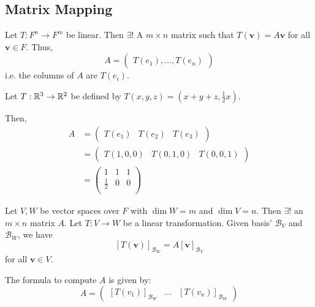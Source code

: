 \documentclass{article}
\begin{document}
\subsection{Matrix Mapping}
\begin{theorem}
  Let $T: F^n \to F^m$ be linear. Then $\exists!$ A $m \times n$ matrix such that $T(\textbf{v}) = A\textbf{v}$ for all $\textbf{v} \in F$. Thus,
  \[A =
    \begin{pmatrix}
      T(e_1), \ldots, T(e_n)
    \end{pmatrix}\] i.e. the columns of $A$ are $T(e_i)$.
\end{theorem}
\begin{example}
  Let $T: \mathbb{R}^3 \to \mathbb{R}^2$ be defined by $T(x, y, z) = (x+y+z, \frac{1}{2}x)$.

  Then,
  \begin{align*}
    A & =
    \begin{pmatrix}
      T(e_1) & T(e_2) & T(e_3)
    \end{pmatrix}             \\
      & =
    \begin{pmatrix}
      T(1, 0, 0) & T(0, 1, 0) & T(0, 0, 1)
    \end{pmatrix} \\
      & =
    \begin{pmatrix}
      1           & 1 & 1 \\
      \frac{1}{2} & 0 & 0 \\
    \end{pmatrix}
  \end{align*}
\end{example}
\begin{theorem}
  Let $V, W$ be vector spaces over $F$ with $\dim W = m$ and $\dim V = n$. Then $\exists!$ an $m \times n$ matrix $A$. Let $T: V \to W$ be a linear transformation. Given basis' $\mathcal{B}_V$ and $\mathcal{B}_W$, we have \[
    [T(\textbf{v})]_{\mathcal{B}_W} = A[\textbf{v}]_{\mathcal{B}_V}
  \] for all $\textbf{v} \in V$.

  The formula to compute $A$ is given by:
  \[
    A =
    \begin{pmatrix}
      [T(v_1)]_{\mathcal{B}_W} & \ldots & [T(v_n)]_{\mathcal{B}_W}
    \end{pmatrix}
  \]

\end{theorem}
\end{document}
